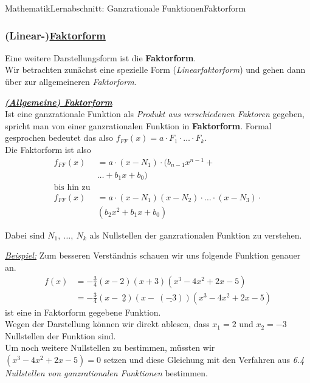 \documentclass[11pt,twocolumn,oneside,openany,headings=optiontotoc,11pt,numbers=noenddot]{article}
\begin{document}
\begin{worksheet}{Mathematik}{Lernabschnitt: Ganzrationale Funktionen}{Faktorform}
		\subsubsection{(Linear-)\underline{Faktorform}}
		Eine weitere Darstellungsform ist die \textbf{Faktorform}.\\
		Wir betrachten zunächst eine spezielle Form (\textit{Linearfaktorform}) und gehen dann über zur allgemeineren \textit{Faktorform}.\\
		\par
		\underline{\textbf{\textit{(Allgemeine) Faktorform}}}\\
		Ist eine ganzrationale Funktion als \textit{Produkt aus verschiedenen Faktoren} gegeben, spricht man von einer ganzrationalen Funktion in \textbf{Faktorform}. Formal gesprochen bedeutet das also \(f_{FF}(x) = a\cdot{}F_1\cdot\ldots\cdot{}F_k\).\\
		Die Faktorform ist also 
		\begin{align*}
			f_{FF}(x) & = a\cdot{}(x-N_1)\cdot{}(b_{n-1}x^{n-1}+\\
			&\ldots{}+b_1x+ b_0)\\
			\text{bis hin zu}\\
			f_{FF}(x) & = a\cdot{}(x-N_1)(x-N_2)\cdot{}\ldots{}\cdot{}(x-N_3)\cdot\\
			&(b_{2}x^2 + b_1x + b_0)
		\end{align*}
		\par\noindent
		Dabei sind \(N_1,\ \ldots,\ N_k\) als Nullstellen der ganzrationalen Funktion zu verstehen.\\
		\par\noindent
		\underline{\textit{Beispiel:}} Zum besseren Verständnis schauen wir uns folgende Funktion genauer an.\\
		\begin{align*}
			f(x) & = -\frac{3}{4}(x-2)(x+3)(x^3 - 4x^2 + 2x -5)\\
			& = -\frac{3}{4}(x-\ \underline{2})(x-\ (\underline{-3}))(x^3-4x^2+2x-5)
		\end{align*}
		ist eine in Faktorform gegebene Funktion.\\
		Wegen der Darstellung können wir direkt ablesen, dass \colorbox{green!10}{\(x_1 = 2\)} und \colorbox{green!10}{\(x_2 = -3\)} Nullstellen der Funktion sind.\\
		Um noch weitere Nullstellen zu bestimmen, müssten wir \((x^3-4x^2 + 2x -5 ) = 0\) setzen und diese Gleichung mit den Verfahren aus \textit{6.4 Nullstellen von ganzrationalen Funktionen} bestimmen.
		\begin{framed}

\end{framed}
\end{worksheet}
\end{document}
